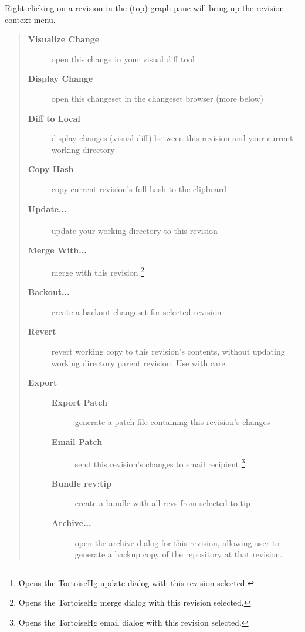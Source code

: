 \documentclass[letterpaper,10pt,english]{manual}
\begin{document}
Right-clicking on a revision in the (top) graph pane will bring up the
revision context menu.
\begin{quote}
\begin{description}
\item[\textbf{Visualize Change}]
open this change in your visual diff tool

\item[\textbf{Display Change}]
open this changeset in the changeset browser (more below)

\item[\textbf{Diff to Local}]
display changes (visual diff) between this revision and your
current working directory

\item[\textbf{Copy Hash}]
copy current revision's full hash to the clipboard

\item[\textbf{Update...}]
update your working directory to this revision \footnote{
Opens the TortoiseHg update dialog with this revision selected.
}

\item[\textbf{Merge With...}]
merge with this revision \footnote{
Opens the TortoiseHg merge dialog with this revision selected.
}

\item[\textbf{Backout...}]
create a backout changeset for selected revision

\item[\textbf{Revert}]
revert working copy to this revision's contents, without
updating working directory parent revision. Use with care.

\item[\textbf{Export}]\begin{description}
\item[\textbf{Export Patch}]
generate a patch file containing this revision's changes

\item[\textbf{Email Patch}]
send this revision's changes to email recipient \footnote{
Opens the TortoiseHg email dialog with this revision selected.
}

\item[\textbf{Bundle rev:tip}]
create a bundle with all revs from selected to tip

\item[\textbf{Archive...}]
open the archive dialog for this revision, allowing user to
generate a backup copy of the repository at that revision.


\end{description}
\end{description}
\end{quote}
\end{document}
